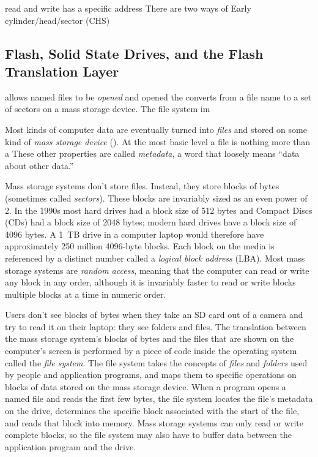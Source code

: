

read and write has a specific address There are two ways of Early cylinder/head/sector (CHS) 

\subsection{Flash, Solid State Drives, and the Flash Translation Layer}

allows named files to be \emph{opened} and 
opened the converts from a file name to a set of sectors on a mass storage
device. The file system im

Most kinds of computer data are eventually turned into \emph{files}
and stored on some kind of
\emph{mass storage device} (). At the most basic level a file is
nothing more than a  These other properties are called \emph{metadata},
a word that loosely means ``data about other data.''

Mass storage systems don't store files. Instead, they store blocks of
bytes (sometimes called \emph{sectors}). These blocks are invariably
sized as an even power of 2. In the 1990s most hard drives had a block
size of 512 bytes and Compact Discs (CDs) had a block size of 2048
bytes; modern hard drives have a block size of 4096 bytes. A 1~TB
drive in a computer laptop would therefore have approximately 250
million 4096-byte blocks. Each block on the media is referenced
by a distinct number called a \emph{logical block address} (LBA). Most
mass storage systems are \emph{random access}, meaning that the
computer can read or write any block in any order, although it is
invariably faster to read or write blocks multiple blocks at a time in numeric order.

Users don't see blocks of bytes when they take an SD card out of a
camera and try to read it on their laptop: they see folders and
files. The translation between the mass storage system's blocks of
bytes and the files that are shown on the computer's screen is
performed by a piece of code inside the operating system called the
\emph{file system}.  The file system takes the concepts of
\emph{files} and \emph{folders} used by people and application
programs, and maps them to specific operations on blocks of data
stored on the mass storage device. When a program opens a named file
and reads the first few bytes, the file system locates the file's
metadata on the drive, determines the specific block associated with
the start of the file, and reads that block into memory. Mass storage
systems can only read or write complete blocks, so the file system may
also have to buffer data between the application program and the
drive.

